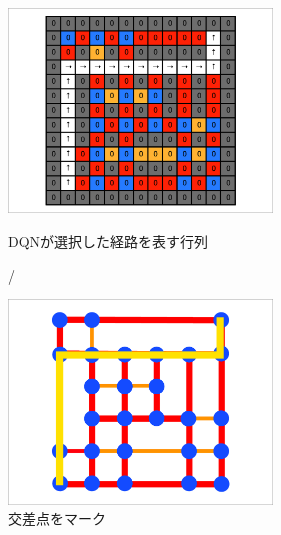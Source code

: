 \begin{figure}[htbp]
    \begin{minipage}{0.5\hsize}
        \begin{center}
            \includegraphics[width=70mm]{assets/action_vector.eps}
        \end{center}
        \caption{DQNが選択した経路を表す行列}
        \label{out:vector}
    \end{minipage}
    \begin{minipage}{0.5\hsize}/
        \begin{center}
            \includegraphics[width=70mm]{assets/action_vector_visualize.eps}
        \end{center}
        \caption{交差点をマーク}
        \label{out:map}
    \end{minipage}
\end{figure}



